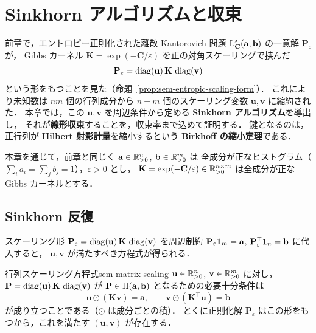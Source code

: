 \chapter{Sinkhorn アルゴリズムと収束}
\label{ch:seminar-04-sinkhorn}

前章で，エントロピー正則化された離散 Kantorovich 問題
$\mathrm{L}_{\mathbf{C}}^\varepsilon(\mathbf{a}, \mathbf{b})$ の一意解 $\mathbf{P}_\varepsilon$ が，
Gibbs カーネル $\mathbf{K} = \exp(-\mathbf{C}/\varepsilon)$ を正の対角スケーリングで挟んだ
\[
  \mathbf{P}_\varepsilon = \operatorname{diag}(\mathbf{u})\,\mathbf{K}\,\operatorname{diag}(\mathbf{v})
\]
という形をもつことを見た（命題~\ref{prop:sem-entropic-scaling-form}）．
これにより未知数は $nm$ 個の行列成分から $n+m$ 個のスケーリング変数 $\mathbf{u}, \mathbf{v}$ に縮約された．
本章では，この $\mathbf{u}, \mathbf{v}$ を周辺条件から定める \textbf{Sinkhorn アルゴリズム}を導出し，
それが\textbf{線形収束}することを，収束率まで込めて証明する．
鍵となるのは，正行列が \textbf{Hilbert 射影計量}を縮小するという
\textbf{Birkhoff の縮小定理}である．

本章を通じて，前章と同じく $\mathbf{a} \in \mathbb{R}_{>0}^n$, $\mathbf{b} \in \mathbb{R}_{>0}^m$ は
全成分が正なヒストグラム（$\sum_i a_i = \sum_j b_j = 1$），$\varepsilon > 0$ とし，
$\mathbf{K} = \exp(-\mathbf{C}/\varepsilon) \in \mathbb{R}_{>0}^{n\times m}$ は全成分が正な Gibbs カーネルとする．

\section{Sinkhorn 反復}
\label{sec:sem-sinkhorn-iteration}

スケーリング形 $\mathbf{P}_\varepsilon = \operatorname{diag}(\mathbf{u})\,\mathbf{K}\,\operatorname{diag}(\mathbf{v})$ を周辺制約
$\mathbf{P}_\varepsilon\mathbf{1}_m = \mathbf{a}$, $\mathbf{P}_\varepsilon^\top\mathbf{1}_n = \mathbf{b}$ に代入すると，
$\mathbf{u}, \mathbf{v}$ が満たすべき方程式が得られる．

\begin{proposition}{行列スケーリング方程式}{sem-matrix-scaling}
  $\mathbf{u} \in \mathbb{R}_{>0}^n$, $\mathbf{v} \in \mathbb{R}_{>0}^m$ に対し，
  $\mathbf{P} = \operatorname{diag}(\mathbf{u})\,\mathbf{K}\,\operatorname{diag}(\mathbf{v})$ が
  $\mathbf{P} \in \Pi(\mathbf{a}, \mathbf{b})$ となるための必要十分条件は
  \[
    \mathbf{u} \odot (\mathbf{K}\mathbf{v}) = \mathbf{a},
    \qquad
    \mathbf{v} \odot (\mathbf{K}^\top\mathbf{u}) = \mathbf{b}
  \]
  が成り立つことである（$\odot$ は成分ごとの積）．
  とくに正則化解 $\mathbf{P}_\varepsilon$ はこの形をもつから，これを満たす
  $(\mathbf{u}, \mathbf{v})$ が存在する．
\end{proposition}

